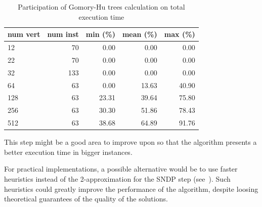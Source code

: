 \begin{table}[t!]
\caption{Participation of Gomory-Hu trees calculation on total execution time}
\label{table_gomory_hu_gap}
\centering
    \begin{tabular}{lrrrr}
        \toprule
        num vert & num inst & min (\%) & mean (\%) & max (\%) \\
        \midrule
        12 & 70 & 0.00 & 0.00 & 0.00 \\
        22 & 70 & 0.00 & 0.00 & 0.00 \\
        32 & 133 & 0.00 & 0.00 & 0.00 \\
        64 & 63 & 0.00 & 13.63 & 40.90 \\
        128 & 63 & 23.31 & 39.64 & 75.80 \\
        256 & 63 & 30.30 & 51.86 & 78.43 \\
        512 & 63 & 38.68 & 64.89 & 91.76 \\
        \bottomrule
    \end{tabular}
\end{table}

This step might be a good area to improve upon so that the algorithm presents a better execution time in bigger instances.

For practical implementations, a possible alternative would be to use faster heuristics instead of the 2-approximation for the SNDP step (see~\cite{Ker2005}). 
Such heuristics could greatly improve the performance of the algorithm, despite loosing theoretical guarantees of the quality of the solutions.
